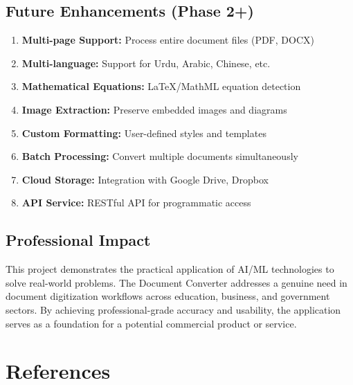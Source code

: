 \documentclass[12pt,a4paper]{article}
\begin{document}
\subsection{Future Enhancements (Phase 2+)}
\begin{enumerate}
    \item \textbf{Multi-page Support:} Process entire document files (PDF, DOCX)
    \item \textbf{Multi-language:} Support for Urdu, Arabic, Chinese, etc.
    \item \textbf{Mathematical Equations:} LaTeX/MathML equation detection
    \item \textbf{Image Extraction:} Preserve embedded images and diagrams
    \item \textbf{Custom Formatting:} User-defined styles and templates
    \item \textbf{Batch Processing:} Convert multiple documents simultaneously
    \item \textbf{Cloud Storage:} Integration with Google Drive, Dropbox
    \item \textbf{API Service:} RESTful API for programmatic access
\end{enumerate}

\subsection{Professional Impact}
This project demonstrates the practical application of AI/ML technologies to solve real-world problems. The Document Converter addresses a genuine need in document digitization workflows across education, business, and government sectors. By achieving professional-grade accuracy and usability, the application serves as a foundation for a potential commercial product or service.

\newpage

\section*{References}
\end{document}
